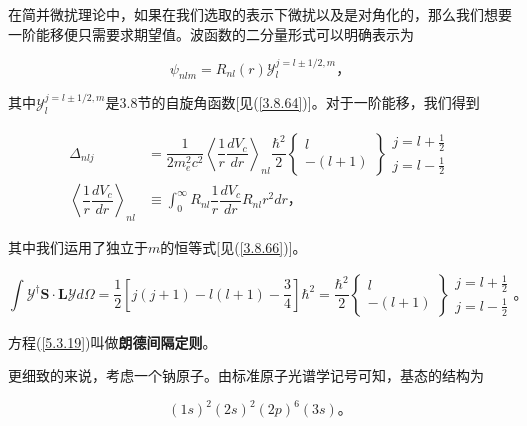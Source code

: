﻿\documentclass[UTF8,twoside]{ctexart}
\begin{document}
在简并微扰理论中，如果在我们选取的表示下微扰以及是对角化的，那么我们想要一阶能移便只需要求期望值。波函数的二分量形式可以明确表示为

\begin{equation} \label{5.3.18}
\psi_{nlm}=R_{nl}(r)\mathcal{Y}_l^{j=l\pm 1/2,m}\text{，}
\end{equation}

\noindent 其中$\mathcal{Y}_l^{j=l\pm1/2,m}$是3.8节的自旋角函数[见(\ref{3.8.64})]。对于一阶能移，我们得到

\begin{equation} \label{5.3.19}
\begin{split}
\Delta_{nlj}&=\dfrac{1}{2m_e^2c^2}\left\langle\dfrac{1}{r}\dfrac{dV_c}{dr}\right\rangle_{nl} \dfrac{\hbar^2}{2}\left\{\begin{array}{c}
l \\
-(l+1)
\end{array}\right\}\begin{array}{c}
j=l+\frac{1}{2} \\
j=l-\frac{1}{2}
\end{array} \\
\left\langle\dfrac{1}{r}\dfrac{dV_c}{dr}\right\rangle_{nl}&\equiv \displaystyle\int_0^{\infty}R_{nl}\dfrac{1}{r}\dfrac{dV_c}{dr}R_{nl}r^2dr\text{，}
\end{split}
\end{equation}

\noindent 其中我们运用了独立于$m$的恒等式[见(\ref{3.8.66})]。

\begin{equation} \label{5.3.20}
\displaystyle\int \mathcal{Y}^{\dag} \boldsymbol{S\cdot L}\mathcal{Y}d\Omega= \dfrac{1}{2}\left[j(j+1)-l(l+1)-\dfrac{3}{4}\right]\hbar^2 =\dfrac{\hbar^2}{2}\left\{\begin{array}{c}
l \\
-(l+1)\end{array}\right\}\begin{array}{c}
j=l+\frac{1}{2} \\
j=l-\frac{1}{2} \end{array}\text{。}
\end{equation}

\noindent 方程(\ref{5.3.19})叫做{\textbf{朗德间隔定则}}。

更细致的来说，考虑一个钠原子。由标准原子光谱学记号可知，基态的结构为

\begin{equation} \label{5.3.21}
(1s)^2(2s)^2(2p)^6(3s)\text{。}
\end{equation}
\end{document}
